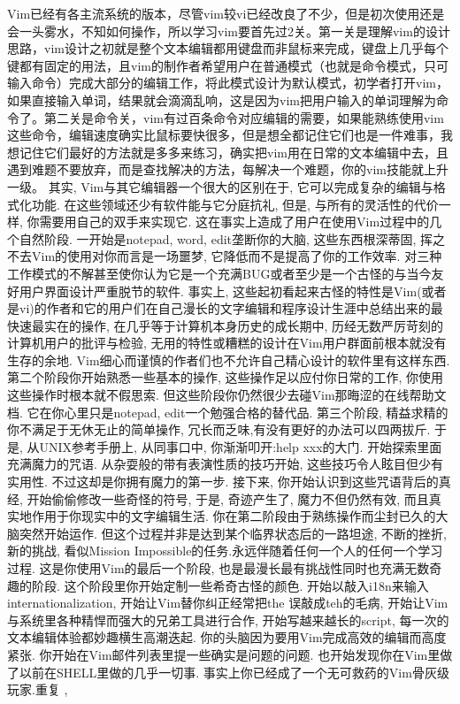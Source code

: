 \documentclass[11pt]{article}
\begin{document}
   Vim已经有各主流系统的版本，尽管vim较vi已经改良了不少，但是初次使用还是会一头雾水，不知如何操作，所以学习vim要首先过2关。第一关是理解vim的设计思路，vim设计之初就是整个文本编辑都用键盘而非鼠标来完成，键盘上几乎每个键都有固定的用法，且vim的制作者希望用户在普通模式（也就是命令模式，只可输入命令）完成大部分的编辑工作，将此模式设计为默认模式，初学者打开vim，如果直接输入单词，结果就会滴滴乱响，这是因为vim把用户输入的单词理解为命令了。第二关是命令关，vim有过百条命令对应编辑的需要，如果能熟练使用vim这些命令，编辑速度确实比鼠标要快很多，但是想全都记住它们也是一件难事，我想记住它们最好的方法就是多多来练习，确实把vim用在日常的文本编辑中去，且遇到难题不要放弃，而是查找解决的方法，每解决一个难题，你的vim技能就上升一级。
   其实, Vim与其它编辑器一个很大的区别在于, 它可以完成复杂的编辑与格式化功能. 在这些领域还少有软件能与它分庭抗礼, 但是, 与所有的灵活性的代价一样, 你需要用自己的双手来实现它. 这在事实上造成了用户在使用Vim过程中的几个自然阶段.
   一开始是notepad, word, edit垄断你的大脑, 这些东西根深蒂固, 挥之不去Vim的使用对你而言是一场噩梦, 它降低而不是提高了你的工作效率. 对三种工作模式的不解甚至使你认为它是一个充满BUG或者至少是一个古怪的与当今友好用户界面设计严重脱节的软件. 事实上, 这些起初看起来古怪的特性是Vim(或者是vi)的作者和它的用户们在自己漫长的文字编辑和程序设计生涯中总结出来的最快速最实在的操作, 在几乎等于计算机本身历史的成长期中, 历经无数严厉苛刻的计算机用户的批评与检验, 无用的特性或糟糕的设计在Vim用户群面前根本就没有生存的余地. Vim细心而谨慎的作者们也不允许自己精心设计的软件里有这样东西.
   第二个阶段你开始熟悉一些基本的操作, 这些操作足以应付你日常的工作, 你使用这些操作时根本就不假思索. 但这些阶段你仍然很少去碰Vim那晦涩的在线帮助文档. 它在你心里只是notepad, edit一个勉强合格的替代品.
   第三个阶段, 精益求精的你不满足于无休无止的简单操作, 冗长而乏味,有没有更好的办法可以四两拔斤. 于是, 从UNIX参考手册上, 从同事口中, 你渐渐叩开:help xxx的大门. 开始探索里面充满魔力的咒语. 从杂耍般的带有表演性质的技巧开始, 这些技巧令人眩目但少有实用性. 不过这却是你拥有魔力的第一步. 接下来, 你开始认识到这些咒语背后的真经, 开始偷偷修改一些奇怪的符号, 于是, 奇迹产生了, 魔力不但仍然有效, 而且真实地作用于你现实中的文字编辑生活. 你在第二阶段由于熟练操作而尘封已久的大脑突然开始运作. 但这个过程并非是达到某个临界状态后的一路坦途, 不断的挫折, 新的挑战, 看似Mission Impossible的任务.永远伴随着任何一个人的任何一个学习过程. 这是你使用Vim的最后一个阶段, 也是最漫长最有挑战性同时也充满无数奇趣的阶段. 这个阶段里你开始定制一些希奇古怪的颜色. 开始以敲入i18n来输入internationalization, 开始让Vim替你纠正经常把the 误敲成teh的毛病, 开始让Vim与系统里各种精悍而强大的兄弟工具进行合作, 开始写越来越长的script, 每一次的文本编辑体验都妙趣横生高潮迭起. 你的头脑因为要用Vim完成高效的编辑而高度紧张. 你开始在Vim邮件列表里提一些确实是问题的问题. 也开始发现你在Vim里做了以前在SHELL里做的几乎一切事. 事实上你已经成了一个无可救药的Vim骨灰级玩家.重复 ,
\end{document}

